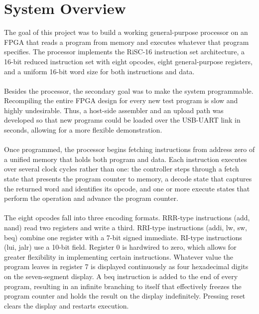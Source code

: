 \documentclass[11pt,letterpaper]{article}
\begin{document}
\vspace{1em}
\tableofcontents
\newpage

\section{System Overview}
The goal of this project was to build a working general-purpose processor on an FPGA that reads a program from memory and executes whatever that program specifies. The processor implements the RiSC-16 instruction set architecture, a 16-bit reduced instruction set with eight opcodes, eight general-purpose registers, and a uniform 16-bit word size for both instructions and data.\\
\\
Besides the processor, the secondary goal was to make the system programmable. Recompiling the entire FPGA design for every new test program is slow and highly undesirable. Thus, a host-side assembler and an upload path was developed so that new programs could be loaded over the USB-UART link in seconds, allowing for a more flexible demonstration.\\
\\
Once programmed, the processor begins fetching instructions from address zero of a unified memory that holds both program and data. Each instruction executes over several clock cycles rather than one: the controller steps through a fetch state that presents the program counter to memory, a decode state that captures the returned word and identifies its opcode, and one or more execute states that perform the operation and advance the program counter.\\
\\
The eight opcodes fall into three encoding formats. RRR-type instructions (add, nand) read two registers and write a third. RRI-type instructions (addi, lw, sw, beq) combine one register with a 7-bit signed immediate. RI-type instructions (lui, jalr) use a 10-bit field. Register 0 is hardwired to zero, which allows for greater flexibility in implementing certain instructions. Whatever value the program leaves in register 7 is displayed continuously as four hexadecimal digits on the seven-segment display. A beq instruction is added to the end of every program, resulting in an infinite branching to itself that effectively freezes the program counter and holds the result on the display indefinitely. Pressing reset clears the display and restarts execution.\\
\end{document}
